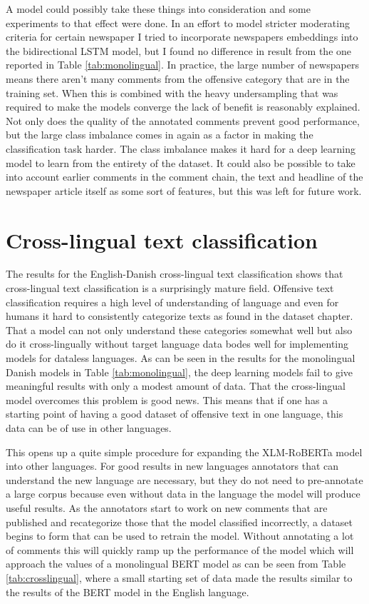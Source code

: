 \documentclass[nofilelist]{cslthse-msc}
\begin{document}
A model could possibly take these things into consideration and some experiments to that effect were done. In an effort to model stricter moderating criteria for certain newspaper I tried to incorporate newspapers embeddings into the bidirectional LSTM model, but I found no difference in result from the one reported in Table \ref{tab:monolingual}. In practice, the large number of newspapers means there aren't many comments from the offensive category that are in the training set. When this is combined with the heavy undersampling that was required to make the models converge the lack of benefit is reasonably explained. Not only does the quality of the annotated comments prevent good performance, but the large class imbalance comes in again as a factor in making the classification task harder. The class imbalance makes it hard for a deep learning model to learn from the entirety of the dataset.  It could also be possible to take into account earlier comments in the comment chain, the text and headline of the newspaper article itself as some sort of features, but this was left for future work.

\section{Cross-lingual text classification}

The results for the English-Danish cross-lingual text classification shows that cross-lingual text classification is a surprisingly mature field. Offensive text classification requires a high level of understanding of language and even for humans it hard to consistently categorize texts as found in the dataset chapter. That a model can not only understand these categories somewhat well but also do it cross-lingually without target language data bodes well for implementing models for dataless languages. As can be seen in the results for the monolingual Danish models in Table \ref{tab:monolingual}, the deep learning models fail to give meaningful results with only a modest amount of data. That the cross-lingual model overcomes this problem is good news. This means that if one has a starting point of having a good dataset of offensive text in one language, this data can be of use in other languages. 

This opens up a quite simple procedure for expanding the XLM-RoBERTa model into other languages. For good results in new languages annotators that can understand the new language are necessary, but they do not need to pre-annotate a large corpus because even without data in the language the model will produce useful results. As the annotators start to work on new comments that are published and recategorize those that the model classified incorrectly, a dataset begins to form that can be used to retrain the model. Without annotating a lot of comments this will quickly ramp up the performance of the model which will approach the values of a monolingual BERT model as can be seen from Table \ref{tab:crosslingual}, where a small starting set of data  made the results similar to the results of the BERT model in the English language. 
\end{document}
